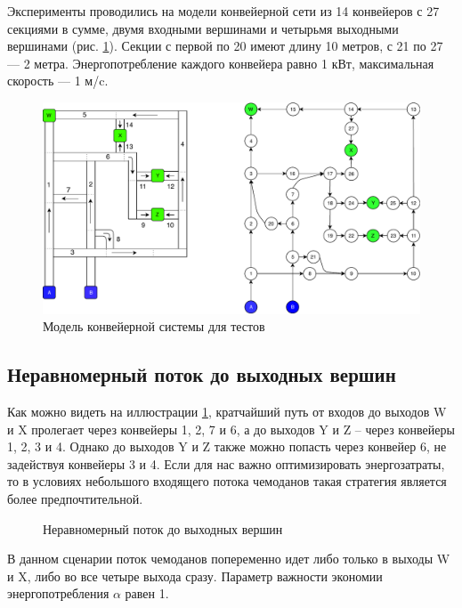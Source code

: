 \documentclass[specification,annotation,times]{itmo-student-thesis}
\theoremstyle{definition}
\begin{document}
Эксперименты проводились на модели конвейерной сети из 14 конвейеров с 27
секциями в сумме, двумя входными вершинами и четырьмя выходными вершинами (рис.
\ref{test-conveyors}). Секции с первой по 20 имеют длину 10 метров, с 21 по 27 --- 2
метра. Энергопотребление каждого конвейера равно 1 кВт, максимальная
скорость --- 1 м/c.

\begin{figure}[!h]
  \caption{Модель конвейерной системы для тестов}\label{test-conveyors}
  \centering
  \includegraphics[scale=0.5]{test-conveyors}
\end{figure}

\subsection{Неравномерный поток до выходных вершин}

Как можно видеть на иллюстрации \ref{test-conveyors}, кратчайший путь от входов
до выходов W и X пролегает через конвейеры 1, 2, 7 и 6, а до выходов Y и Z --
через конвейеры 1, 2, 3 и 4. Однако до выходов Y и Z также можно попасть через
конвейер 6, не задействуя конвейеры 3 и 4. Если для нас важно оптимизировать
энергозатраты, то в условиях небольшого входящего потока чемоданов такая
стратегия является более предпочтительной.

\begin{figure}[!h]
  \centering
  \hfil
  \caption{Неравномерный поток до выходных вершин}\label{experiments:conveyors:1}
\end{figure}

В данном сценарии поток чемоданов попеременно идет либо только в выходы W и X,
либо во все четыре выхода сразу. Параметр важности экономии энергопотребления
$\alpha$ равен 1.
\end{document}
